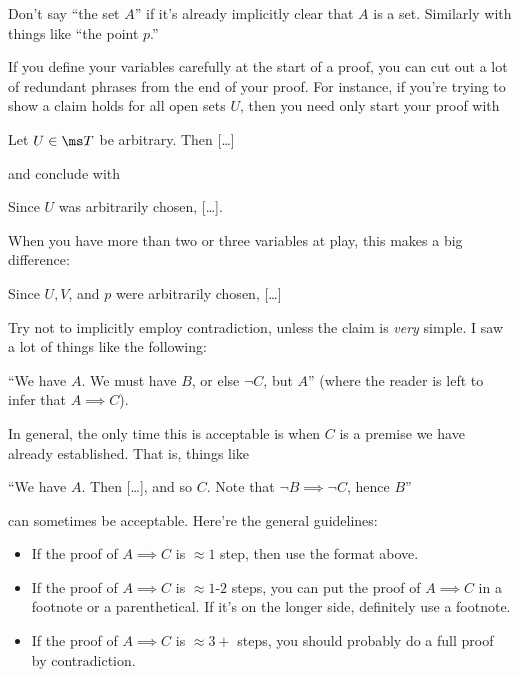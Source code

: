 \documentclass{fkpset}
\begin{document}
\begin{problem}[A3]
  Don't say ``the set $A$'' if it's already implicitly clear that $A$ is a set.
  Similarly with things like ``the point $p$.''
\end{problem}
\begin{problem}[A4]
  If you define your variables carefully at the start of a proof, you can cut
  out a lot of redundant phrases from the end of your proof. For instance, if
  you're trying to show a claim holds for all open sets $U$, then you need only
  start your proof with
  \begin{leftbar}
    Let $U \in \ms T$ be arbitrary. Then [\ldots]
  \end{leftbar}
  and conclude with
  \begin{leftbar}
    Since $U$ was arbitrarily chosen, [\ldots].
  \end{leftbar}
  When you have more than two or three variables at play, this makes a big
  difference:
  \begin{leftbar}
    Since $U,V$, and $p$ were arbitrarily chosen, [\ldots]
  \end{leftbar}
\end{problem}
\begin{problem}[A5]
  Try not to implicitly employ contradiction, unless the claim is \emph{very}
  simple. I saw a lot of things like the following:
  \begin{leftbar}
    ``We have $A$. We must have $B$, or else $\neg C$, but $A$'' (where the
    reader is left to infer that $A \implies C$).
  \end{leftbar}
  In general, the only time this is acceptable is when $C$ is a premise we have
  already established. That is, things like
  \begin{leftbar}
    ``We have $A$. Then [\ldots], and so $C$. Note that $\neg B \implies \neg
    C$, hence $B$''
  \end{leftbar}
  can sometimes be acceptable. Here're the general guidelines:
  \begin{itemize}
    \item If the proof of $A\implies C$ is $\approx 1$ step, then use the format
      above.
    \item If the proof of $A \implies C$ is $\approx 1$-$2$ steps, you can put
      the proof of $A \implies C$ in a footnote or a parenthetical. If it's on
      the longer side, definitely use a footnote.
    \item If the proof of $A \implies C$ is $\approx 3+$ steps, you should
      probably do a full proof by contradiction.
  \end{itemize}
\end{problem}
\end{document}
